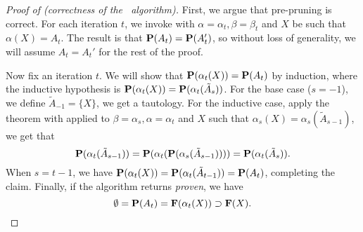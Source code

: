 \begin{proof}[Proof of  (correctness of the \PR\ algorithm)]
First, we argue that pre-pruning is correct.
For each iteration $t$, we invoke  with $\alpha = \alpha_t,
\beta = \beta_t$ and $X$ be such that $\alpha(X) = A_t$.
The result is that $\mathbf{P}(A_t) = \mathbf{P}(A_t')$, so without loss of generality,
we will assume $A_t = A_t'$ for the rest of the proof.

Now fix an iteration $t$.
We will show that $\mathbf{P}(\alpha_t(X)) = \mathbf{P}(A_t)$ by induction,
where the inductive hypothesis is $\mathbf{P}(\alpha_t(X)) = \mathbf{P}(\alpha_t(\tilde A_s))$.
For the base case ($s = -1$), we define $\tilde A_{-1} = \{X\}$, we get a tautology.
For the inductive case, apply the theorem with 
applied to $\beta = \alpha_s, \alpha = \alpha_t$ and $X$ such that $\alpha_s(X) = \alpha_s(\tilde A_{s-1})$,
we get that 
\[ \mathbf{P}(\alpha_t(\tilde A_{s-1})) = \mathbf{P}(\alpha_t(\mathbf{P}(\alpha_s(\tilde A_{s-1})))) = \mathbf{P}(\alpha_t(\tilde A_s)). \]
When $s = t-1$, we have $\mathbf{P}(\alpha_t(X)) = \mathbf{P}(\alpha_t(\tilde A_{t-1})) = \mathbf{P}(A_t)$,
completing the claim.
Finally, if the algorithm returns {\em proven}, we have
\[ \emptyset = \mathbf{P}(A_t) = \mathbf{F}(\alpha_t(X)) \supset \mathbf{F}(X). \]
\end{proof}
